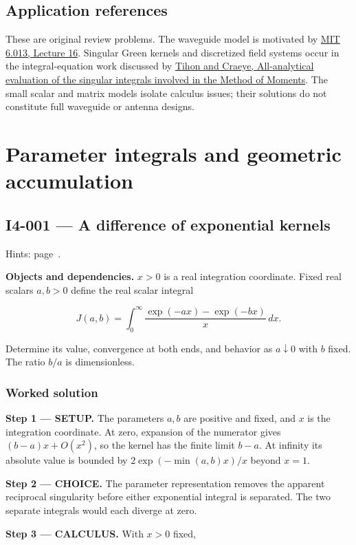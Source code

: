 \documentclass[11pt,oneside,openany]{book}
\begin{document}
\section{Application references}

These are original review problems. The waveguide model is motivated by
\href{https://www.ocw.mit.edu/courses/6-013-electromagnetics-and-applications-spring-2009/d9425aa2b1acd0c1fc121965ad7eafec_MIT6_013S09_lec16.pdf}{MIT 6.013, Lecture 16}.
Singular Green kernels and discretized field systems occur in the integral-equation
work discussed by \href{https://arxiv.org/abs/1911.12660}{Tihon and Craeye, All-analytical evaluation of the singular integrals involved in the Method of Moments}.
The small scalar and matrix models isolate calculus issues; their solutions do
not constitute full waveguide or antenna designs.

\chapter{Parameter integrals and geometric accumulation}
\markright{}
\section{I4-001 --- A difference of exponential kernels}
\label{problem:I4-001}
{\small Hints: page~\pageref{hints:I4-001}.}\par\medskip

\textbf{Objects and dependencies.} \(x>0\) is a real integration coordinate. Fixed real scalars \(a,b>0\) define the real scalar integral

\[
J(a,b)=\int_0^\infty\frac{\exp(-ax)-\exp(-bx)}{x}\,dx.
\]

Determine its value, convergence at both ends, and behavior as \(a\downarrow0\) with \(b\) fixed. The ratio \(b/a\) is dimensionless.
\subsection*{Worked solution}

\textbf{Step 1 --- SETUP.} The parameters \(a,b\) are positive and fixed, and \(x\) is the integration coordinate. At zero, expansion of the numerator gives \((b-a)x+O(x^2)\), so the kernel has the finite limit \(b-a\). At infinity its absolute value is bounded by \(2\exp(-\min(a,b)x)/x\) beyond \(x=1\).

\begin{ChoiceStep}
\textbf{Step 2 --- CHOICE.} The parameter representation removes the apparent reciprocal singularity before either exponential integral is separated. The two separate integrals would each diverge at zero.

\end{ChoiceStep}
\textbf{Step 3 --- CALCULUS.} With \(x>0\) fixed,
\end{document}
